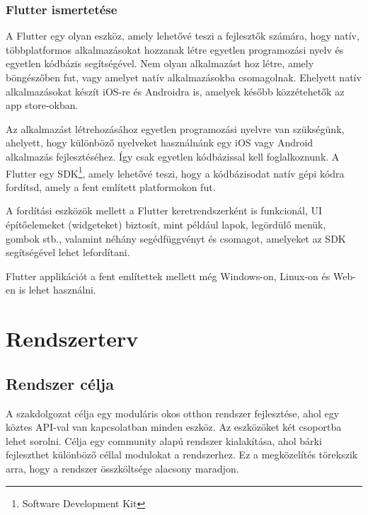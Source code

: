 \documentclass{thesis-ekf}
\theoremstyle{definition}
\theoremstyle{remark}
\begin{document}
	\subsection{Flutter ismertetése}
	A Flutter egy olyan eszköz, amely lehetővé teszi a fejlesztők számára, hogy natív, többplatformos alkalmazásokat hozzanak létre egyetlen programozási nyelv és egyetlen kódbázis segítségével. Nem olyan alkalmazást hoz létre, amely böngészőben fut, vagy amelyet natív alkalmazásokba csomagolnak. Ehelyett natív alkalmazásokat készít iOS-re és Androidra is, amelyek később közzétehetők az app store-okban.
	
	
	Az alkalmazást létrehozásához egyetlen programozási nyelvre van szükségünk, ahelyett, hogy különböző nyelveket használnánk egy iOS vagy Android alkalmazás fejlesztéséhez. Így csak egyetlen kódbázissal kell foglalkoznunk. A Flutter egy SDK\footnote{Software Development Kit}, amely lehetővé teszi, hogy a kódbázisodat natív gépi kódra fordítsd, amely a fent említett platformokon fut.
	
	
	A fordítási eszközök mellett a Flutter keretrendszerként is funkcionál, UI építőelemeket (widgeteket) biztosít, mint például lapok, legördülő menük, gombok stb., valamint néhány segédfüggvényt és csomagot, amelyeket az SDK segítségével lehet lefordítani.\cite{bib_flutter_short}
	
	Flutter applikációt a fent említettek mellett még Windows-on, Linux-on és Web-en is lehet használni.
	\chapter{Rendszerterv}
	\section{Rendszer célja}
	A szakdolgozat célja egy moduláris okos otthon rendszer fejlesztése, ahol egy köztes API-val van kapcsolatban minden eszköz. Az eszközöket két csoportba lehet sorolni. Célja egy community alapú rendszer kialakítása, ahol bárki fejleszthet különböző céllal modulokat a rendszerhez. Ez a megközelítés törekszik arra, hogy a rendszer összköltsége alacsony maradjon.
\end{document}
